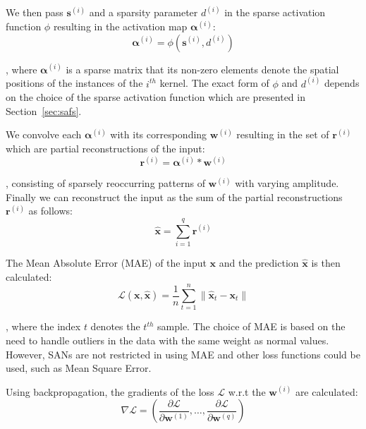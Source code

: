 \documentclass[journal]{IEEEtran}
\begin{document}
We then pass $\bm{s}^{(i)}$ and a sparsity parameter $d^{(i)}$ in the sparse activation function $\phi$ resulting in the activation map $\bm{\alpha}^{(i)}$:
\begin{equation}
	\label{eq:extrema}
	\bm{\alpha}^{(i)} = \phi(\bm{s}^{(i)}, d^{(i)})
\end{equation}

\noindent
, where $\bm{\alpha}^{(i)}$ is a sparse matrix that its non-zero elements denote the spatial positions of the instances of the $i^{th}$ kernel.
The exact form of $\phi$ and $d^{(i)}$ depends on the choice of the sparse activation function which are presented in Section~\ref{sec:safs}.

We convolve each $\bm{\alpha}^{(i)}$ with its corresponding $\bm{w}^{(i)}$ resulting in the set of $\bm{r}^{(i)}$ which are partial reconstructions of the input:
\begin{equation}
	\label{eq:reconstructions}
	\bm{r}^{(i)} = \bm{\alpha}^{(i)} * \bm{w}^{(i)}
\end{equation}

\noindent
, consisting of sparsely reoccurring patterns of $\bm{w}^{(i)}$ with varying amplitude.
Finally we can reconstruct the input as the sum of the partial reconstructions $\bm{r}^{(i)}$ as follows:
\begin{equation}
	\label{eq:output1}
	\hat{\bm{x}} = \sum\limits_{i=1}^q \bm{r}^{(i)}
\end{equation}

The Mean Absolute Error (MAE) of the input $\bm{x}$ and the prediction $\hat{\bm{x}}$ is then calculated:
\begin{equation}
	\label{eq:lossfunction}
	\mathcal{L}\left( {\bm{x},\hat{\bm{x}}} \right) = \frac{1}{n}\sum\limits_{t=1}^n \Big\lVert\hat{\bm{x}}_t - \bm{x}_t \Big\rVert
\end{equation}

\noindent
, where the index $t$ denotes the $t^{th}$ sample.
The choice of MAE is based on the need to handle outliers in the data with the same weight as normal values.
However, SANs are not restricted in using MAE and other loss functions could be used, such as Mean Square Error.

Using backpropagation, the gradients of the loss $\mathcal{L}$ w.r.t the $\bm{w}^{(i)}$ are calculated:
\begin{equation}
	\label{eq:backpropagation1}
	\nabla\mathcal{L} = \left( \frac{\partial\mathcal{L}}{\partial\bm{w}^{(1)}},\ldots,\frac{\partial\mathcal{L}}{\partial\bm{w}^{(q)}}\right)
\end{equation}
\end{document}
